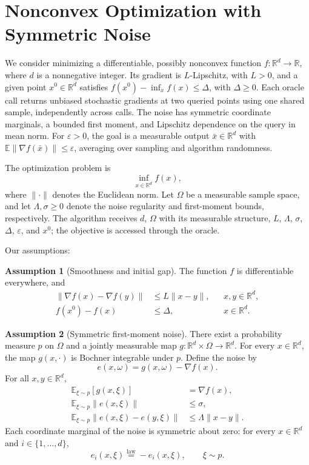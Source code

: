 \documentclass[10pt]{article}
\theoremstyle{definition}
\newtheorem{assumption}{Assumption}
\begin{document}
\section*{Nonconvex Optimization with Symmetric Noise}
We consider minimizing a differentiable, possibly nonconvex function $f:\mathbb{R}^d\to\mathbb{R}$, where $d$ is a nonnegative integer. Its gradient is $L$-Lipschitz, with $L>0$, and a given point $x^0\in\mathbb{R}^d$ satisfies $f(x^0)-\inf_x f(x)\leq\Delta$, with $\Delta\geq0$. Each oracle call returns unbiased stochastic gradients at two queried points using one shared sample, independently across calls. The noise has symmetric coordinate marginals, a bounded first moment, and Lipschitz dependence on the query in mean norm. For $\varepsilon>0$, the goal is a measurable output $\bar{x}\in\mathbb{R}^d$ with $\mathbb{E}\|\nabla f(\bar{x})\|\leq\varepsilon$, averaging over sampling and algorithm randomness.

The optimization problem is
\[
\inf_{x\in\mathbb{R}^d} f(x),
\]
where $\|\cdot\|$ denotes the Euclidean norm. Let $\Omega$ be a measurable sample space, and let $\Lambda,\sigma\geq0$ denote the noise regularity and first-moment bounds, respectively. The algorithm receives $d$, $\Omega$ with its measurable structure, $L$, $\Lambda$, $\sigma$, $\Delta$, $\varepsilon$, and $x^0$; the objective is accessed through the oracle.

Our assumptions:
\begin{assumption}[Smoothness and initial gap]
The function $f$ is differentiable everywhere, and
\[
\begin{aligned}
\|\nabla f(x)-\nabla f(y)\|&\leq L\|x-y\|,
&&x,y\in\mathbb{R}^d,\\
f(x^0)-f(x)&\leq\Delta,
&&x\in\mathbb{R}^d.
\end{aligned}
\]
\end{assumption}

\begin{assumption}[Symmetric first-moment noise]
There exist a probability measure $p$ on $\Omega$ and a jointly measurable map $g:\mathbb{R}^d\times\Omega\to\mathbb{R}^d$. For every $x\in\mathbb{R}^d$, the map $g(x,\cdot)$ is Bochner integrable under $p$. Define the noise by
\[
e(x,\omega)=g(x,\omega)-\nabla f(x).
\]
For all $x,y\in\mathbb{R}^d$,
\[
\begin{aligned}
\mathbb{E}_{\xi\sim p}[g(x,\xi)]&=\nabla f(x),\\
\mathbb{E}_{\xi\sim p}\|e(x,\xi)\|&\leq\sigma,\\
\mathbb{E}_{\xi\sim p}\|e(x,\xi)-e(y,\xi)\|
&\leq\Lambda\|x-y\|.
\end{aligned}
\]
Each coordinate marginal of the noise is symmetric about zero: for every $x\in\mathbb{R}^d$ and $i\in\{1,\ldots,d\}$,
\[
e_i(x,\xi)\overset{\mathrm{law}}{=}-e_i(x,\xi),
\qquad \xi\sim p.
\]
\end{assumption}
\end{document}
